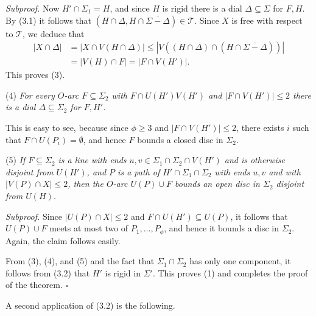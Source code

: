 \textit{Subproof.} Now $H' \cap \Sigma_1 = H$, and since $H$ is rigid there is a dial $\Delta \subseteq \Sigma$ for $F, H$. By (3.1) it follows that $(H \cap \Delta, H \cap \overline{\Sigma - \Delta}) \in \mathscr{T}$. Since $X$ is free with respect to $\mathscr{T}$, we deduce that
\begin{align*}
|X \cap \Delta| &= |X \cap V(H \cap \Delta)| \le |V((H \cap \Delta) \cap (H \cap \overline{\Sigma - \Delta}))| \\
&= |V(H) \cap F| = |F \cap V(H')|.
\end{align*}
This proves (3).

\hspace*{12pt}(4) \textit{For every $O$-arc $F \subseteq \Sigma_2$ with $F \cap U(H')V(H')$ and $|F \cap V(H')| \le 2$ there is a dial $\Delta \subseteq \Sigma_2$ for $F, H'$.}

This is easy to see, because since $\phi \ge 3$ and $|F \cap V(H')| \le 2$, there exists $i$ such that $F \cap U(P_i) = \emptyset$, and hence $F$ bounds a closed disc in $\Sigma_2$.

\hspace*{12pt}(5) \textit{If $F \subseteq \Sigma_2$ is a line with ends $u, v \in \Sigma_1 \cap \Sigma_2 \cap V(H')$ and is otherwise disjoint from $U(H')$, and $P$ is a path of $H' \cap \Sigma_1 \cap \Sigma_2$ with ends $u, v$ and with $|V(P) \cap X| \le 2$, then the $O$-arc $U(P) \cup F$ bounds an open disc in $\Sigma_2$ disjoint from $U(H)$.}

\textit{Subproof.} Since $|U(P) \cap X| \le 2$ and $F \cap U(H') \subseteq U(P)$, it follows that $U(P) \cup F$ meets at most two of $P_1, \dots, P_\phi$, and hence it bounds a disc in $\Sigma_2$. Again, the claim follows easily.

From (3), (4), and (5) and the fact that $\Sigma_1 \cap \Sigma_2$ has only one component, it follows from (3.2) that $H'$ is rigid in $\Sigma'$. This proves (1) and completes the proof of the theorem. $\square$

A second application of (3.2) is the following.

